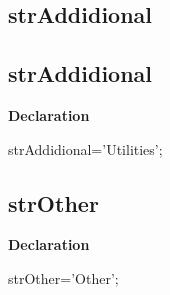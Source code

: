 \documentclass{report}
\newif\ifpdf
\begin{document}
\subsection*{\large{\textbf{strAddidional}}\normalsize\hspace{1ex}\hrulefill}
\else
\subsection*{strAddidional}
\fi
\label{trstrings-strAddidional}
\begin{list}{}{
\setlength{\itemindent}{0cm}
\setlength{\listparindent}{0cm}
\setlength{\leftmargin}{\evensidemargin}
\addtolength{\leftmargin}{\tmplength}
\settowidth{\labelsep}{X}
\addtolength{\leftmargin}{\labelsep}
\setlength{\labelwidth}{\tmplength}
}
\item[\textbf{Declaration}\hfill]
\ifpdf
\begin{flushleft}
\fi
\begin{ttfamily}
strAddidional='Utilities';\end{ttfamily}

\ifpdf
\end{flushleft}
\fi

\end{list}
\ifpdf
\subsection*{\large{\textbf{strOther}}\normalsize\hspace{1ex}\hrulefill}
\else
\subsection*{strOther}
\fi
\label{trstrings-strOther}
\begin{list}{}{
\setlength{\itemindent}{0cm}
\setlength{\listparindent}{0cm}
\setlength{\leftmargin}{\evensidemargin}
\addtolength{\leftmargin}{\tmplength}
\settowidth{\labelsep}{X}
\addtolength{\leftmargin}{\labelsep}
\setlength{\labelwidth}{\tmplength}
}
\item[\textbf{Declaration}\hfill]
\ifpdf
\begin{flushleft}
\fi
\begin{ttfamily}
strOther='Other';\end{ttfamily}

\ifpdf
\end{flushleft}
\fi

\end{list}
\ifpdf
\end{document}
